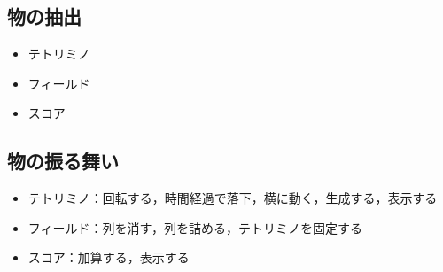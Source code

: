 \subsection{物の抽出}
  \begin{itemize}
    \item テトリミノ
    \item フィールド
    \item スコア
  \end{itemize}
\subsection{物の振る舞い}
  \begin{itemize}
    \item テトリミノ：回転する，時間経過で落下，横に動く，生成する，表示する
    \item フィールド：列を消す，列を詰める，テトリミノを固定する  
    \item スコア：加算する，表示する
  \end{itemize}
